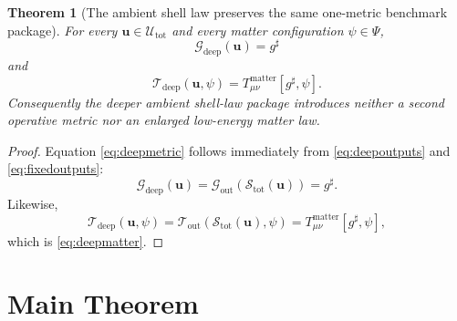 \documentclass[11pt]{article}
\newcommand{\CompletedMetric}{g^{\sharp}}
\newcommand{\MetricOut}{\mathscr G_{\mathrm{out}}}
\newcommand{\MatterOut}{\mathscr T_{\mathrm{out}}}
\newcommand{\DeepMetricOut}{\mathscr G_{\mathrm{deep}}}
\newcommand{\DeepMatterOut}{\mathscr T_{\mathrm{deep}}}
\newcommand{\DeepShell}{\mathcal U_{\mathrm{tot}}}
\newcommand{\ChainSelectTriple}{\mathcal S_{\mathrm{tot}}}
\newtheorem{theorem}{Theorem}
\begin{document}
\begin{theorem}[The ambient shell law preserves the same one-metric benchmark package]
\label{thm:outputs}
For every \(\mathbf u\in\DeepShell\) and every matter configuration \(\psi\in\Psi\),
\begin{equation}
\DeepMetricOut(\mathbf u)=\CompletedMetric
\label{eq:deepmetric}
\end{equation}
and
\begin{equation}
\DeepMatterOut(\mathbf u,\psi)
=
T_{\mu\nu}^{\mathrm{matter}}[\CompletedMetric,\psi].
\label{eq:deepmatter}
\end{equation}
Consequently the deeper ambient shell-law package introduces neither a second operative metric nor an enlarged low-energy matter law.
\end{theorem}

\begin{proof}
Equation \eqref{eq:deepmetric} follows immediately from \eqref{eq:deepoutputs} and \eqref{eq:fixedoutputs}:
\[
\DeepMetricOut(\mathbf u)
=
\MetricOut(\ChainSelectTriple(\mathbf u))
=
\CompletedMetric.
\]
Likewise,
\[
\DeepMatterOut(\mathbf u,\psi)
=
\MatterOut(\ChainSelectTriple(\mathbf u),\psi)
=
T_{\mu\nu}^{\mathrm{matter}}[\CompletedMetric,\psi],
\]
which is \eqref{eq:deepmatter}.
\end{proof}

\section{Main Theorem}
\end{document}
